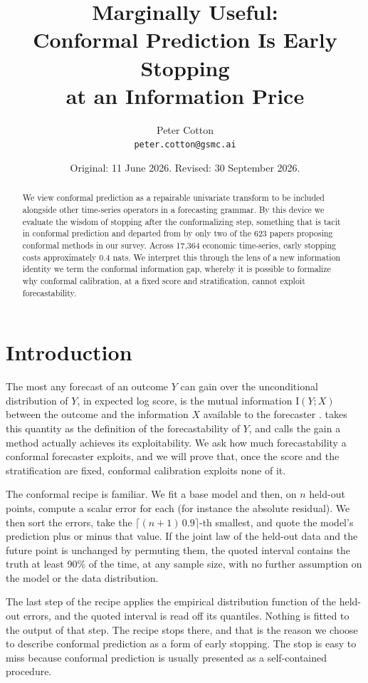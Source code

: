 \documentclass[11pt]{article}
\title{Marginally Useful:\\ Conformal Prediction Is Early Stopping\\ at an Information Price}
\author{}
\author{Peter Cotton\\\texttt{peter.cotton@gsmc.ai}}
\date{Original: 11 June 2026. Revised: 30 September 2026.}
\theoremstyle{remark}
\newcommand{\I}{\mathrm{I}}
\begin{document}
\maketitle

\begin{abstract}
We view conformal prediction as a repairable univariate transform to be included alongside other time-series operators
in a forecasting grammar. By this device we evaluate the wisdom of stopping after the conformalizing step, something that
is tacit in conformal prediction and departed from by only two of the 623 papers proposing conformal methods in our survey. Across 17,364 economic time-series,
 early stopping costs approximately 0.4 nats. We interpret this through the lens of a new information identity we term the conformal information gap,
 whereby it is possible to formalize why conformal calibration, at a fixed score and stratification, cannot exploit forecastability. 
\end{abstract}

\section{Introduction}\label{sec:intro}

The most any forecast of an outcome $Y$ can gain over the unconditional distribution
of $Y$, in expected log score, is the mutual information $\I(Y;X)$ between the outcome
and the information $X$ available to the forecaster \citep{delsole2004}.
\citet{catt2026} takes this quantity as the definition of the forecastability of $Y$,
and calls the gain a method actually achieves its exploitability. We ask how much
forecastability a conformal forecaster exploits, and we will prove that, once the score
and the stratification are fixed, conformal calibration exploits none of it. 

The conformal recipe is familiar. We fit a base model and then, on $n$ held-out points, compute a scalar error
for each (for instance the absolute residual). We then sort the errors, take the
$\lceil (n+1)\,0.9\rceil$-th smallest, and quote the model's prediction plus or
minus that value. If the joint law of the held-out data and the future point is
unchanged by permuting them, the quoted interval contains
the truth at least 90\% of the time, at any sample size, with no further assumption on
the model or the data distribution.

The last step of the recipe applies the empirical distribution function of the
held-out errors, and the quoted interval is read off its quantiles. Nothing is fitted
to the output of that step. The recipe stops there, and that is the reason we 
choose to describe conformal prediction as a form of early stopping. The stop
 is easy to miss because conformal prediction is usually presented as a
self-contained procedure. 
\end{document}
